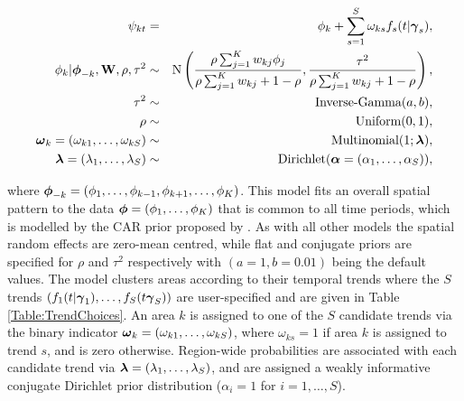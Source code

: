 \documentclass[article, nojss]{jss}
\newcommand{\bd}[1]{\ensuremath{\mbox{\boldmath $#1$}}}
\begin{document}
\begin{eqnarray}
\psi_{kt} &=& \phi_k +  \sum_{s=1}^S   \omega_{ks} f_s(t|\bd{\gamma}_s),\label{carclustrends}\\
\phi_k|\bd{\phi}_{-k},\mathbf{W},\rho, \tau^2&\sim&\mbox{N}\left(\frac{\rho\sum_{j=1}^K w_{kj}\phi_j}{\rho\sum_{j=1}^Kw_{kj} + 1-\rho}, \frac{\tau^2}{\rho\sum_{j=1}^K w_{kj} + 1-\rho}\right),\nonumber\\
\tau^2 &\sim&\mbox{Inverse-Gamma}(a,b),\nonumber\\
\rho&\sim&\mbox{Uniform}(0,1),\nonumber\\
\bd{\omega}_k= (\omega_{k1}, \ldots, \omega_{kS}) &\sim& \mbox{Multinomial}(1; \bd{\lambda}),\nonumber\\
\bd{\lambda} = (\lambda_1,\ldots,\lambda_S)&\sim&\mbox{Dirichlet}(\bd{\alpha}= (\alpha_1, \ldots, \alpha_S)),\nonumber
\end{eqnarray}



where $\bd{\phi}_{-k}=(\phi_1,\ldots,\phi_{k-1}, \phi_{k+1},\ldots,\phi_K)$. This model fits an overall spatial pattern to the data $\bd{\phi}=(\phi_1,\ldots,\phi_K)$ that is common to all time periods, which is modelled by the CAR prior proposed by \cite{leroux2000}. As with all other models the spatial random effects are zero-mean centred, while flat and conjugate priors are specified for $\rho$ and $\tau^2$ respectively with $(a=1, b=0.01)$ being the default values. The model clusters areas according to their temporal trends where the $S$ trends $(f_1(t|\bd{\gamma}_1),\ldots,f_S(t\bd{\gamma}_S))$ are user-specified and are given in Table \ref{Table:TrendChoices}. An area $k$ is assigned to one of the $S$ candidate trends via the binary indicator $\bd{\omega}_k= (\omega_{k1}, \ldots, \omega_{kS})$, where $\omega_{ks} = 1$ if area $k$ is assigned to trend $s$, and is zero otherwise. Region-wide probabilities are associated with each candidate trend via $\bd{\lambda} = (\lambda_1,\ldots,\lambda_S)$, and are assigned a weakly informative conjugate Dirichlet prior distribution ($\alpha_i = 1$ for $i=1,\ldots,S$).
 
\end{document}
